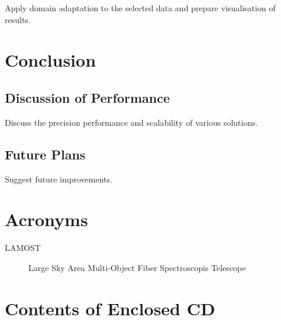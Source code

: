 \documentclass[thesis=M,english]{FITthesis}[2012/10/20]
\begin{document}
Apply domain adaptation to the selected data
and prepare visualisation of results.

\chapter{Conclusion}

\section{Discussion of Performance}

Discuss the precision performance and scalability of various solutions.

\section{Future Plans}

Suggest future improvements.




\appendix

\chapter{Acronyms}
\begin{description}
    \item[LAMOST] Large Sky Area Multi-Object Fiber Spectroscopis Telescope
\end{description}

\chapter{Contents of Enclosed CD}

\begin{figure}
\end{figure}
\end{document}
